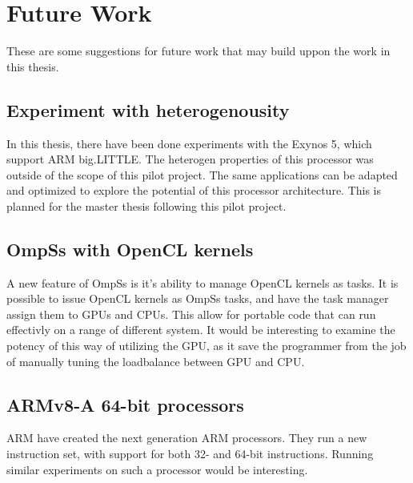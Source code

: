 \chapter[Future Work]{Future Work}
These are some suggestions for future work that may build uppon the work in this thesis.

\section{Experiment with heterogenousity}
In this thesis, there have been done experiments with the Exynos 5, which support ARM big.LITTLE.
The heterogen properties of this processor was outside of the scope of this pilot project.
The same applications can be adapted and optimized to explore the potential of this processor architecture.
This is planned for the master thesis following this pilot project.

\section{OmpSs with OpenCL kernels}
A new feature of OmpSs is it's ability to manage OpenCL kernels as tasks.
It is possible to issue OpenCL kernels as OmpSs tasks, and have the task manager assign them to GPUs and CPUs.
This allow for portable code that can run effectivly on a range of different system.
It would be interesting to examine the potency of this way of utilizing the GPU, as it save the programmer from the job of manually tuning the loadbalance between GPU and CPU.

\section{ARMv8-A 64-bit processors}
ARM have created the next generation ARM processors.
They run a new instruction set, with support for both 32- and 64-bit instructions.
Running similar experiments on such a processor would be interesting.

